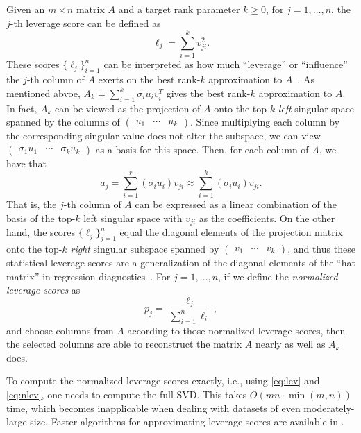 Given an $m \times n$ matrix $A$ and a target rank parameter $k\geq0$, for $j=1,\ldots,n$, the $j$-th leverage score can be defined as
\begin{equation}
 \label{eq:lev}
  \ell_j = \sum_{i=1}^k v_{ji}^2.
\end{equation}
These scores $\{\ell_j\}_{i=1}^{n}$ can be interpreted as how much ``leverage'' or ``influence'' the $j$-th column of $A$ exerts on the best rank-$k$ approximation to $A$~\cite{MD09}. 
As mentioned abvoe, $A_k = \sum_{i=1}^k \sigma_i u_i v_i^T$ gives the best rank-$k$ approximation to $A$.
In fact, $A_k$ can be viewed as the projection of $A$ onto the top-$k$ \emph{left} singular space spanned by the columns of $\begin{pmatrix} u_1 & \cdots & u_k \end{pmatrix}$.
Since multiplying each column by the corresponding singular value does not alter the subspace, we can view
$\begin{pmatrix} \sigma_1 u_1 & \cdots & \sigma_k u_k \end{pmatrix}$ as a basis for this space.  Then, for each column of $A$, we have that
  $$  a_j = \sum_{i=1}^r (\sigma_i u_i) v_{ji} \approx \sum_{i=1}^k (\sigma_i u_i) v_{ji}.  $$
That is, the $j$-th column of $A$ can be expressed as a linear combination of the basis of the top-$k$ left singular space with $v_{ji}$ as the coefficients.
On the other hand, the scores $\{\ell_j\}_{j=1}^{n}$ equal the diagonal elements of the projection matrix onto the top-$k$ \emph{right} singular subspace spanned by $\begin{pmatrix} v_1 & \cdots & v_k \end{pmatrix}$, and thus these statistical leverage scores are a generalization of the diagonal elements of the ``hat matrix'' in regression diagnostics~\cite{MD09}.
For $j=1,\ldots,n$, if we define the {\it normalized leverage scores} as
\begin{equation}
\label{eq:nlev}
  p_j = \frac{\ell_j}{\sum_{i=1}^n \ell_i},
\end{equation}      
and choose columns from $A$ according to those normalized leverage scores, then
the selected columns are able to reconstruct the matrix $A$ nearly as well as $A_k$ does.

To compute the normalized leverage scores exactly, i.e., using \eqref{eq:lev} and \eqref{eq:nlev}, one needs to compute the full SVD.  This takes $O(mn\cdot\min(m,n))$ time, which becomes inapplicable when dealing with datasets of even moderately-large size. 
Faster algorithms for approximating leverage scores are available in \cite{DMMW12}.  



